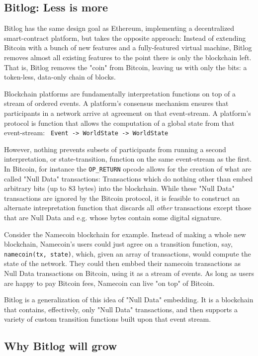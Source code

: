 \documentclass{article}
\theoremstyle{definition}
\theoremstyle{theorem}
\begin{document}
\subsection{Bitlog: Less is more}

Bitlog has the same design goal as Ethereum, implementing a decentralized
smart-contract platform, but takes the opposite approach: Instead of extending
Bitcoin with a bunch of new features and a fully-featured virtual machine,
Bitlog removes almost all existing features to the point there is only the
blockchain left. That is, Bitlog removes the "coin" from Bitcoin, leaving us
with only the bits: a token-less, data-only chain of blocks.

Blockchain platforms are fundamentally interpretation functions on top of a
stream of ordered events. A platform's consensus mechanism ensures that
participants in a network arrive at agreement on that event-stream.
A platform's protocol is function that allows the computation of a global state
from that event-stream: \verb| Event -> WorldState -> WorldState|

However, nothing prevents subsets of participants from running a second
interpretation, or state-transition, function on the same event-stream as the
first. In Bitcoin, for instance the \verb|OP_RETURN| opcode allows for the
creation of what are called "Null Data" transactions: Transactions which do
nothing other than embed arbitrary bits (up to 83 bytes) into the blockchain.
While these "Null Data" transactions are ignored by the Bitcoin protocol, it is
feasible to construct an alternate intrepretation function that discards all
\emph{other} transactions except those that are Null Data and e.g. whose bytes
contain some digital signature.

Consider the Namecoin blockchain for example. Instead of making a whole new
blockchain, Namecoin's users could just agree on a transition function, say,
\verb|namecoin(tx, state)|, which, given an array of transactions, would compute
the state of the network.  They could then embbed their namecoin transactions as
Null Data transactions on Bitcoin, using it as a stream of events. As long as
users are happy to pay Bitcoin fees, Namecoin can live "on top" of
Bitcoin.

Bitlog is a generalization of this idea of "Null Data" embedding. It is a
blockchain that contains, effectively, only "Null Data" transactions, and 
then supports a variety of custom transition functions built upon that event
stream.

\subsection{Why Bitlog will grow}
\end{document}

